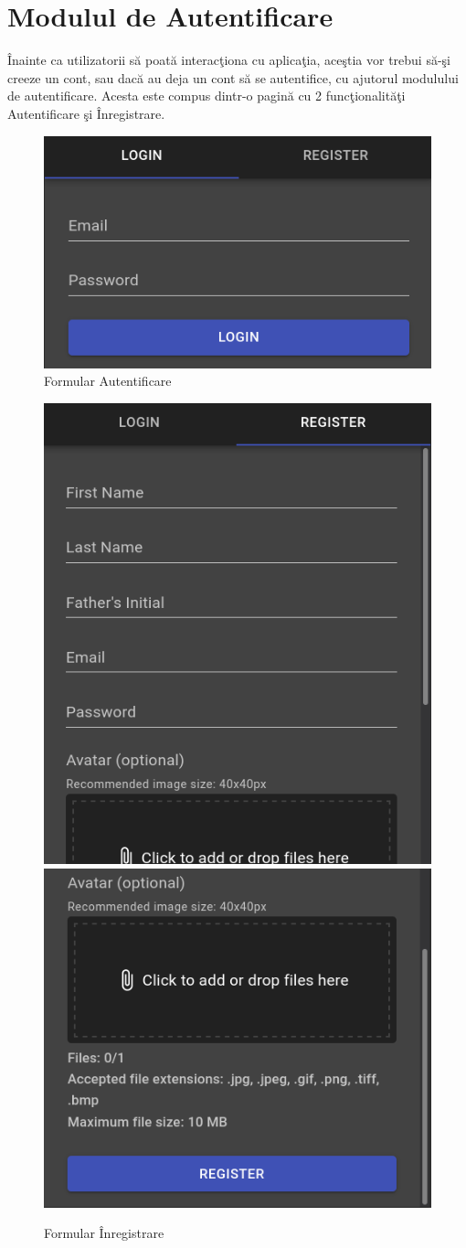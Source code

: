 \documentclass[12pt, a4paper, oneside, romanian]{teza-upb}
\begin{document}
\section{Modulul de Autentificare}

Înainte ca utilizatorii să poată interacţiona cu aplicaţia, aceştia vor trebui să-şi creeze un cont, sau dacă au deja un cont să se autentifice, cu ajutorul modulului de autentificare. Acesta este compus dintr-o pagină cu 2 funcţionalităţi Autentificare şi Înregistrare.

\begin{figure}[H]
\centering
\includegraphics*[width=0.5\columnwidth]{auth-login}
\caption{Formular Autentificare}
\label{formular-autentificare}
\end{figure}

\begin{figure}[H]
\centering
\includegraphics*[width=0.45\columnwidth]{auth-register1}
\includegraphics*[width=0.45\columnwidth]{auth-register2}
\caption{Formular Înregistrare}
\label{formular-inregistrare}
\end{figure}
\end{document}
